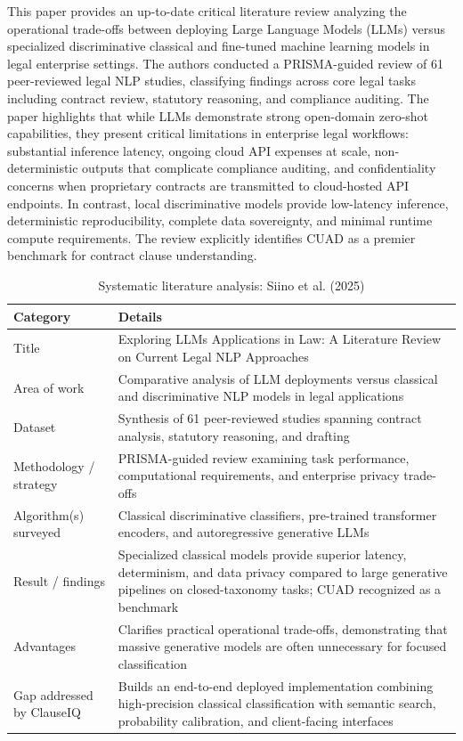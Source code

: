 \vspace{0.5em}
This paper provides an up-to-date critical literature review analyzing the operational trade-offs between deploying Large Language Models (LLMs) versus specialized discriminative classical and fine-tuned machine learning models in legal enterprise settings. The authors conducted a PRISMA-guided review of 61 peer-reviewed legal NLP studies, classifying findings across core legal tasks including contract review, statutory reasoning, and compliance auditing. The paper highlights that while LLMs demonstrate strong open-domain zero-shot capabilities, they present critical limitations in enterprise legal workflows: substantial inference latency, ongoing cloud API expenses at scale, non-deterministic outputs that complicate compliance auditing, and confidentiality concerns when proprietary contracts are transmitted to cloud-hosted API endpoints. In contrast, local discriminative models provide low-latency inference, deterministic reproducibility, complete data sovereignty, and minimal runtime compute requirements. The review explicitly identifies CUAD as a premier benchmark for contract clause understanding.

\begin{table}[htbp]
\centering
\small
\begin{tabular}{>{\raggedright\arraybackslash}p{3.8cm} >{\raggedright\arraybackslash}p{11.0cm}}
\toprule
\textbf{Category} & \textbf{Details} \\
\midrule
Title & Exploring LLMs Applications in Law: A Literature Review on Current Legal NLP Approaches \\
Area of work & Comparative analysis of LLM deployments versus classical and discriminative NLP models in legal applications \\
Dataset & Synthesis of 61 peer-reviewed studies spanning contract analysis, statutory reasoning, and drafting \\
Methodology / strategy & PRISMA-guided review examining task performance, computational requirements, and enterprise privacy trade-offs \\
Algorithm(s) surveyed & Classical discriminative classifiers, pre-trained transformer encoders, and autoregressive generative LLMs \\
Result / findings & Specialized classical models provide superior latency, determinism, and data privacy compared to large generative pipelines on closed-taxonomy tasks; CUAD recognized as a benchmark \\
Advantages & Clarifies practical operational trade-offs, demonstrating that massive generative models are often unnecessary for focused classification \\
Gap addressed by ClauseIQ & Builds an end-to-end deployed implementation combining high-precision classical classification with semantic search, probability calibration, and client-facing interfaces \\
\bottomrule
\end{tabular}
\caption{Systematic literature analysis: Siino et al. (2025)}\label{tab:lit_siino}
\end{table}

